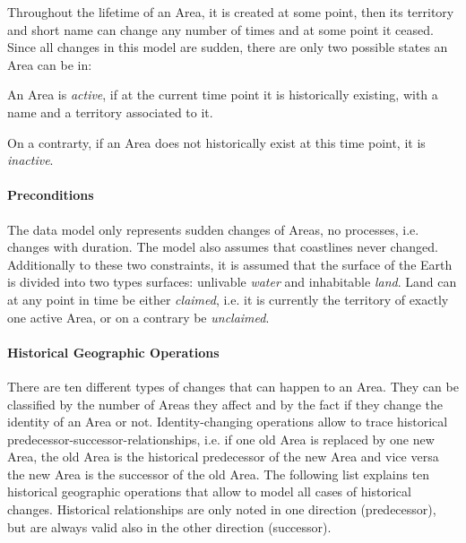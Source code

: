 Throughout the lifetime of an Area, it is created at some point, then its territory and short name can change any number of times and at some point it ceased. Since all changes in this model are sudden, there are only two possible states an Area can be in:
\begin{compactenum}
  \item An Area is \emph{active}, if at the current time point it is historically existing, with a name and a territory associated to it.
  \item On a contrarty, if an Area does not historically exist at this time point, it is \emph{inactive}.
\end{compactenum}


\paragraph{Preconditions} %
\label{par:preconditions}

The data model only represents sudden changes of Areas, no processes, i.e. changes with duration. The model also assumes that coastlines never changed. Additionally to these two constraints, it is assumed that the surface of the Earth is divided into two types surfaces: unlivable \emph{water} and inhabitable \emph{land}. Land can at any point in time be either \emph{claimed}, i.e. it is currently the territory of exactly one active Area, or on a contrary be \emph{unclaimed}.


\paragraph{Historical Geographic Operations} %
\label{par:historical_geographic_operations}

There are ten different types of changes that can happen to an Area. They can be classified by the number of Areas they affect and by the fact if they change the identity of an Area or not. Identity-changing operations allow to trace historical predecessor-successor-relationships, i.e. if one old Area is replaced by one new Area, the old Area is the historical predecessor of the new Area and vice versa the new Area is the successor of the old Area. The following list explains ten historical geographic operations that allow to model all cases of historical changes. Historical relationships are only noted in one direction (predecessor), but are always valid also in the other direction (successor).

